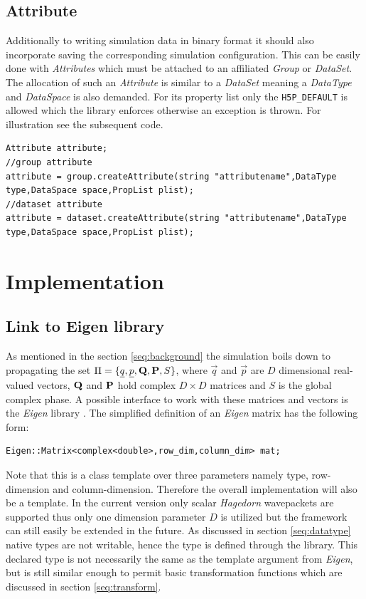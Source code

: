 \section{Attribute}
\label{seq:attribute}
Additionally to writing simulation data in binary format it should also incorporate saving the corresponding simulation configuration. This can be easily done with \textit{Attributes} which must be attached to an affiliated \textit{Group} or \textit{DataSet}. The allocation of such an \textit{Attribute} is similar to a \textit{DataSet} meaning a \textit{DataType} and \textit{DataSpace} is also demanded. For its property list only the \texttt{H5P\_DEFAULT} is allowed which the library enforces otherwise an exception is thrown. For illustration see the subsequent code.
\begin{lstlisting}
Attribute attribute;
//group attribute
attribute = group.createAttribute(string "attributename",DataType type,DataSpace space,PropList plist);
//dataset attribute
attribute = dataset.createAttribute(string "attributename",DataType type,DataSpace space,PropList plist);
\end{lstlisting}

\chapter{Implementation}
\section{Link to Eigen library}
\label{seq:linkeigen}
As mentioned in the section \ref{seq:background} the simulation boils down to propagating the set $\Pi=\{ \underline{q},\underline{p},\mathbf{Q}, \mathbf{P},S\}$, where $\vec{q}$ and $\vec{p}$ are $D$ dimensional real-valued vectors, $\mathbf{Q}$ and $\mathbf{P}$ hold complex $D \times D$ matrices and $S$ is the global complex phase. A possible interface to work with these matrices and vectors is the \textit{Eigen} library \cite{eigenweb}. The simplified definition of an \textit{Eigen} matrix has the following form:
\begin{lstlisting}
Eigen::Matrix<complex<double>,row_dim,column_dim> mat;
\end{lstlisting}
Note that this is a class template over three parameters namely type, row-dimension and column-dimension. Therefore the overall implementation will also be a template. In the current version only scalar \textit{Hagedorn} wavepackets are supported thus only one dimension parameter $D$ is utilized but the framework can still easily be extended in the future. As discussed in section \ref{seq:datatype} native types are not writable, hence the type is defined through the library. This declared type is not necessarily the same as the template argument from \textit{Eigen}, but is still similar enough to permit basic transformation functions which are discussed in section \ref{seq:transform}.

